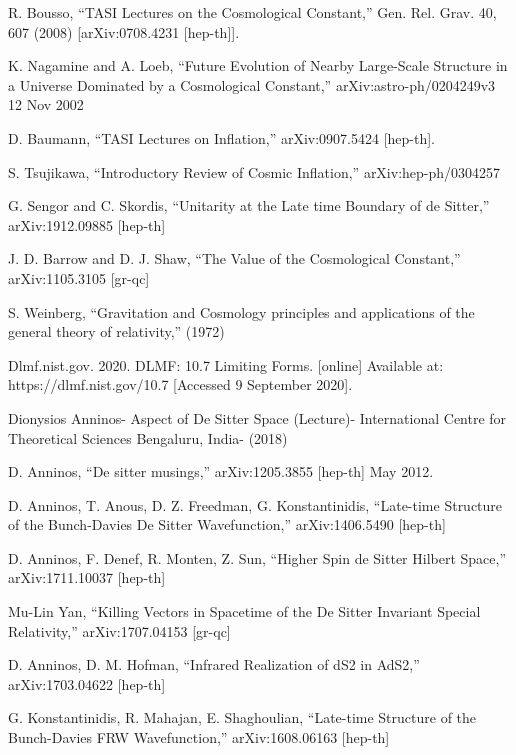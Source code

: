 \documentclass[a4paper,11pt]{article}
\numberwithin{equation}{section}
\numberwithin{figure}{section}
\begin{document}
\begin{large}
\begin{thebibliography}{}
    R. Bousso, “TASI Lectures on the Cosmological Constant,” Gen. Rel. Grav. 40, 607 (2008)
    [arXiv:0708.4231 [hep-th]].

    
    K. Nagamine and A. Loeb, “Future Evolution of Nearby Large-Scale Structure in a Universe
    Dominated by a Cosmological Constant,” arXiv:astro-ph/0204249v3 12 Nov 2002
    
    D. Baumann, “TASI Lectures on Inflation,” arXiv:0907.5424 [hep-th].
    
    S. Tsujikawa, “Introductory Review of Cosmic Inflation,” arXiv:hep-ph/0304257
    
    G. Sengor and C. Skordis, “Unitarity at the Late time Boundary of de Sitter,” arXiv:1912.09885 [hep-th]
    
    J. D. Barrow and D. J. Shaw, “The Value of the Cosmological Constant,” arXiv:1105.3105 [gr-qc]
    
    S. Weinberg, “Gravitation and Cosmology principles and applications of the general theory of relativity,” (1972)

    
    Dlmf.nist.gov. 2020. DLMF: 10.7 Limiting Forms. [online] Available at: https://dlmf.nist.gov/10.7 [Accessed 9 September 2020].
    
    Dionysios Anninos- Aspect of De Sitter Space (Lecture)- 
    International Centre for Theoretical Sciences Bengaluru, India- (2018)
    
    D. Anninos, “De sitter musings,” 	arXiv:1205.3855 [hep-th] May 2012.
    
    D. Anninos, T. Anous, D. Z. Freedman, G. Konstantinidis, “Late-time Structure of the Bunch-Davies De Sitter Wavefunction,” arXiv:1406.5490 [hep-th]
    
    D. Anninos, F. Denef, R. Monten, Z. Sun, “Higher Spin de Sitter Hilbert Space,” arXiv:1711.10037 [hep-th]
    
    Mu-Lin Yan, “Killing Vectors in Spacetime of the De Sitter Invariant Special Relativity,” arXiv:1707.04153 [gr-qc]
    
    D. Anninos, D. M. Hofman, “Infrared Realization of dS2 in AdS2,” 	arXiv:1703.04622 [hep-th]
    
    G. Konstantinidis, R. Mahajan, E. Shaghoulian, “Late-time Structure of the Bunch-Davies FRW Wavefunction,” arXiv:1608.06163 [hep-th]
    

\end{thebibliography}
\end{large}
\end{document}
